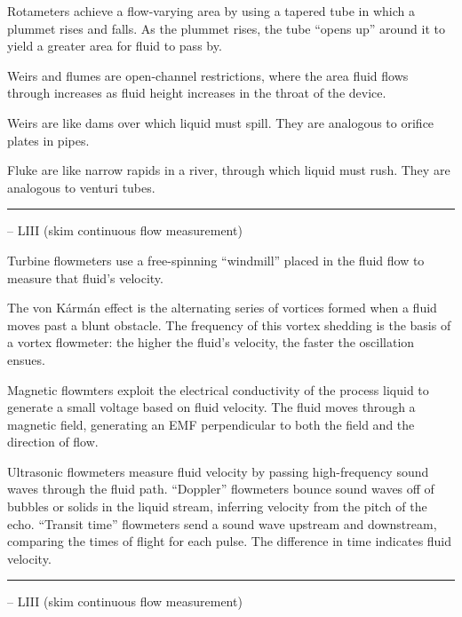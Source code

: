 \begin{itemize}
\begin{itemize}
Rotameters achieve a flow-varying area by using a tapered tube in which a plummet rises and falls.  As the plummet rises, the tube ``opens up'' around it to yield a greater area for fluid to pass by.

\vskip 10pt

Weirs and flumes are open-channel restrictions, where the area fluid flows through increases as fluid height increases in the throat of the device.

\vskip 10pt

Weirs are like dams over which liquid must spill.  They are analogous to orifice plates in pipes.

\vskip 10pt

Fluke are like narrow rapids in a river, through which liquid must rush.  They are analogous to venturi tubes.

\vskip 5pt \hrule \vskip 5pt  -- LIII (skim continuous flow measurement) \vskip 10pt

Turbine flowmeters use a free-spinning ``windmill'' placed in the fluid flow to measure that fluid's velocity.

\vskip 10pt

The von K\'arm\'an effect is the alternating series of vortices formed when a fluid moves past a blunt obstacle.  The frequency of this vortex shedding is the basis of a vortex flowmeter: the higher the fluid's velocity, the faster the oscillation ensues.

\vskip 10pt

Magnetic flowmters exploit the electrical conductivity of the process liquid to generate a small voltage based on fluid velocity.  The fluid moves through a magnetic field, generating an EMF perpendicular to both the field and the direction of flow.

\vskip 10pt

Ultrasonic flowmeters measure fluid velocity by passing high-frequency sound waves through the fluid path.  ``Doppler'' flowmeters bounce sound waves off of bubbles or solids in the liquid stream, inferring velocity from the pitch of the echo.  ``Transit time'' flowmeters send a sound wave upstream and downstream, comparing the times of flight for each pulse.  The difference in time indicates fluid velocity.


\vskip 5pt \hrule \vskip 5pt  -- LIII (skim continuous flow measurement) \vskip 10pt


\end{itemize}
\end{itemize}
